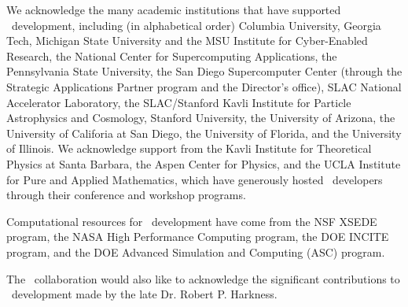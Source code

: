 We acknowledge the  many academic institutions that have supported \enzo\
development, including (in alphabetical order)
Columbia University,
Georgia Tech,
Michigan State University and the MSU Institute for Cyber-Enabled
Research, 
the National Center for Supercomputing Applications, 
the Pennsylvania State University,
 the San Diego Supercomputer Center (through the Strategic Applications
Partner program and the Director’s office),
SLAC National Accelerator Laboratory,
the SLAC/Stanford Kavli Institute for Particle
Astrophysics and Cosmology,  
Stanford University,
the University of Arizona,
the University of Califoria at San Diego, 
the University of Florida,
and the University of Illinois.
We acknowledge support from the Kavli Institute for Theoretical
Physics at Santa Barbara, the Aspen Center for Physics, and the UCLA
Institute for Pure and Applied Mathematics, which have
generously hosted \enzo\ developers through their conference and
workshop programs.

Computational resources for \enzo\ development have come from the NSF
XSEDE program, the NASA High Performance Computing program, the DOE INCITE
program, and the DOE Advanced Simulation and Computing (ASC) program.

The \enzo\ collaboration would also like to acknowledge the significant contributions to
\enzo\ development made by the late Dr. Robert P. Harkness. 

